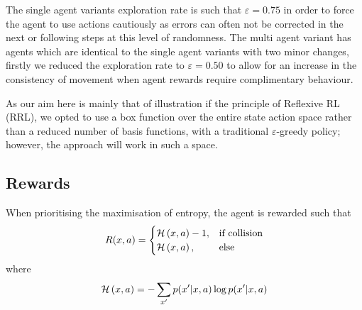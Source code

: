 \documentclass{article}
\begin{document}
The single agent variants exploration rate is such that $\varepsilon=0.75$ in order to force the agent to use actions cautiously as errors can often not be corrected in the next or following steps at this level of randomness. The multi agent variant has agents which are identical to the single agent variants with two minor changes, firstly we reduced the exploration rate to $\varepsilon=0.50$ to allow for an increase in the consistency of movement when agent rewards require complimentary behaviour. 

As our aim here is mainly that of illustration if the principle of Reflexive RL (RRL), we opted to use a box function over the entire state action space rather than a reduced number of basis functions, with a traditional $\varepsilon$-greedy policy; however, the approach will work in such a space.

\subsection{Rewards}

When prioritising the maximisation of entropy, the agent is rewarded such that
\begin{equation}
R(x,a)=
\begin{cases}
{\cal H}\left(x,a\right)-1 ,& $if collision$ \\
{\cal H}\left(x,a\right),& $else$
\end{cases}
	\label{reward}
\end{equation}
where
\begin{equation}
{\cal H}\left(x,a\right) = -\sum_{x'} p(x'|x,a) \log p(x'|x,a)
\end{equation}

\end{document}

